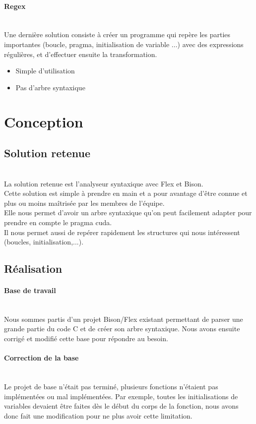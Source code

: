 \documentclass{article}
\begin{document}
	
	\paragraph{Regex}
	~~\\
	\indent
	Une dernière solution consiste à créer un programme qui repère les parties importantes (boucle, pragma, initialisation de variable ...) avec des expressions régulières, et d'effectuer ensuite la transformation.
	\begin{itemize}
		\item Simple d'utilisation
		\item Pas d'arbre syntaxique
	\end{itemize}
		
	
	
	\newpage		
	
	\section{Conception}
	
	\subsection{Solution retenue}
	~~\\
	\indent
	La solution retenue est l'analyseur syntaxique avec Flex et Bison. \\Cette solution est simple à prendre en main et a pour avantage d'être connue et plus ou moins maîtrisée par les membres de l'équipe. \\Elle nous permet d'avoir un arbre syntaxique qu'on peut facilement adapter pour prendre en compte le pragma cuda. \\Il nous permet aussi de repérer rapidement les structures qui nous intéressent (boucles, initialisation,...).	
	\subsection{Réalisation}

	\paragraph{Base de travail}
	~~\\
	\indent
	Nous sommes partis d'un projet Bison/Flex existant permettant de parser une grande partie du code C et de créer son arbre syntaxique. Nous avons ensuite corrigé et modifié cette base pour répondre au besoin.
	
	\paragraph{Correction de la base}
	~~\\
	\indent
	Le projet de base n'était pas terminé, plusieurs fonctions n'étaient pas implémentées ou mal implémentées. Par exemple, toutes les initialisations de variables devaient être faites dès le début du corps de la fonction, nous avons donc fait une modification pour ne plus avoir cette limitation.
	
\end{document}
